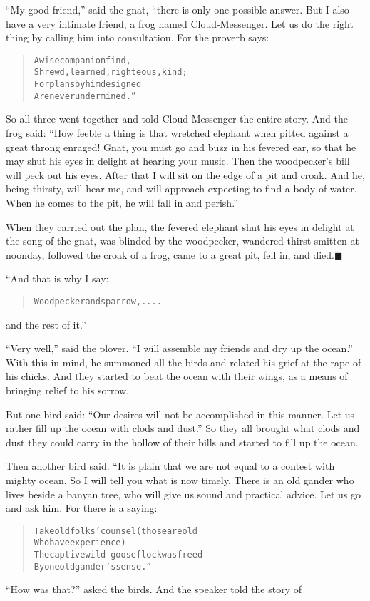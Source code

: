 \documentclass[article, twoside, 14pt]{memoir}
\newcommand{\qed}{\hfill \ensuremath{\blacksquare}}
\renewenvironment{verbatim}{%
\begin{quote}%
\vskip -10pt%
\begin{alltt}\normalfont\large}{\end{alltt}%
\end{quote}%
\vskip -10pt
} %
\begin{document}
``My good friend,'' said the gnat, “there is only one possible
answer. But I also have a very intimate friend, a frog named
Cloud-Messenger. Let us do the right thing by calling him into
consultation. For the proverb says:

\begin{verbatim}
A wise companion find,
Shrewd, learned, righteous, kind;
For plans by him designed
Are never undermined.”
\end{verbatim}
So all three went together and told Cloud-Messenger the entire
story. And the frog said:
``How feeble a thing is that wretched elephant when pitted against a great throng enraged! Gnat, you must go and buzz in his fevered ear, so that he may shut his eyes in delight at hearing your music. Then the woodpecker's bill will peck out his eyes. After that I will sit on the edge of a pit and croak. And he, being thirsty, will hear me, and will approach expecting to find a body of water. When he comes to the pit, he will fall in and perish.''

When they carried out the plan, the fevered elephant shut his eyes
in delight at the song of the gnat, was blinded by the woodpecker,
wandered thirst-smitten at noonday, followed the croak of a frog,
came to a great pit, fell in, and died.\hyperref[s21]{\qed}

“And that is why I say:

\begin{verbatim}
Woodpecker and sparrow, . . . .
\end{verbatim}
and the rest of it.”

``Very well,'' said the plover.
``I will assemble my friends and dry up the ocean.'' With this in
mind, he summoned all the birds and related his grief at the rape
of his chicks. And they started to beat the ocean with their wings,
as a means of bringing relief to his sorrow.

But one bird said:
``Our desires will not be accomplished in this manner. Let us rather fill up the ocean with clods and dust.''
So they all brought what clods and dust they could carry in the
hollow of their bills and started to fill up the ocean.

Then another bird said: “It is plain that we are not equal to a
contest with mighty ocean. So I will tell you what is now timely.
There is an old gander who lives beside a banyan tree, who will
give us sound and practical advice. Let us go and ask him. For
there is a saying:

\begin{verbatim}
Take old folks' counsel (those are old
    Who have experience)
The captive wild-goose flock was freed
    By one old gander's sense.”
\end{verbatim}
``How was that?'' asked the birds. And the speaker told the story
of
\end{document}
